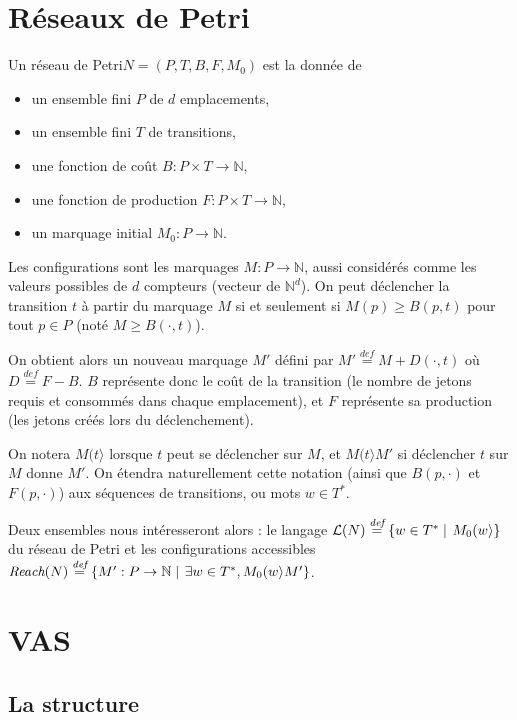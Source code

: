 \documentclass[a4paper,final]{article}
\theoremstyle{definition}
\let\geq\geqslant
\newcommand{\set}[2]{\left\{#1\mathrel{\left|\vphantom{#1}\vphantom{#2}\right.}#2\right\}}
\newcommand{\defeq}{\ensuremath{\stackrel{\textit{def}}{=}}}
\newcommand{\N}{\ensuremath{\mathbb{N}}}
\newcommand{\petri}{réseau de Petri\xspace}
\newcommand{\fire}[2]{\ensuremath{#1 (#2\rangle}}
\newcommand{\lang}{\ensuremath{\mathcal{L}}}
\newcommand{\reach}{\ensuremath{\textit{Reach}}}
\begin{document}
\section{Réseaux de Petri}

Un \petri $N = (P,T,B,F,M_0)$ est la donnée de
\begin{itemize}
    \item un ensemble fini $P$ de $d$ emplacements,
    \item un ensemble fini $T$ de transitions,
    \item une fonction de coût $B: P\times T\to\N$,
    \item une fonction de production $F: P\times T\to\N$,
    \item un marquage initial $M_0: P\to\N$.
\end{itemize}

Les configurations sont les marquages $M: P\to\N$, aussi considérés comme les valeurs possibles de $d$ compteurs (vecteur de $\N^d$).
On peut déclencher la transition $t$ à partir du marquage $M$ si et
seulement si $M(p)\geq B(p,t)$ pour tout $p\in P$ (noté $M\geq B(\cdot,t)$).

On obtient alors un nouveau marquage $M'$ défini par $M' \defeq M+D(\cdot,t)$ où $D\defeq F-B$. 
$B$ représente donc le coût de la transition (le nombre de jetons requis et consommés dans chaque emplacement), et $F$ représente sa production (les jetons créés lors du déclenchement).

On notera $\fire{M}{t}$ lorsque $t$ peut se déclencher sur $M$, et $\fire{M}{t}M'$ si déclencher $t$ sur $M$ donne $M'$.
On étendra naturellement cette notation (ainsi que $B(p,\cdot)$ et $F(p,\cdot)$) aux séquences de transitions, ou mots $w\in T^\ast$.

Deux ensembles nous intéresseront alors : le langage $\lang(N)\defeq \set{w\in T^\ast} {\fire{M_0}{w}}$ du \petri et les configurations accessibles $\reach(N)\defeq \set{M':P\to\N}{\exists w\in T^\ast, \fire{M_0}{w}M'}$.


\section{VAS}

\subsection{La structure}
\end{document}
